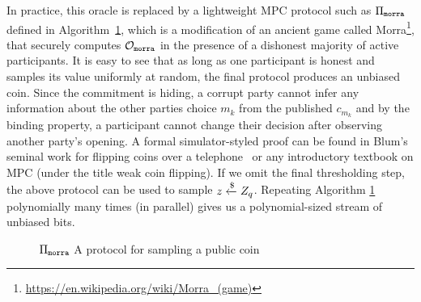 In practice, this oracle is replaced by a lightweight MPC protocol such as $\Pi_{\mathtt{morra}}$ defined in Algorithm~\ref{alg: morra}, which is a modification of an ancient game called Morra\footnote{\url{https://en.wikipedia.org/wiki/Morra_(game)}}, that securely computes $\mathcal{O}_{\mathtt{morra}}$ in the presence of a dishonest majority of active participants.
It is easy to see that as long as one participant is honest and samples its value uniformly at random, the final protocol produces an unbiased coin.  Since the commitment is hiding, a corrupt party cannot infer any information about the other parties choice $m_k$ from the published $c_{m_k}$ and by the binding property, a participant cannot change their decision after observing another party's opening. A formal simulator-styled proof can be found in Blum's seminal work for flipping coins over a telephone~\cite{blum1983coin} or any introductory textbook on MPC (under the title weak coin flipping).  If we omit the final thresholding step, the above protocol can be used to sample $z \xleftarrow{\$} Z_q$. Repeating Algorithm \ref{alg: morra} polynomially many times (in parallel) gives us a polynomial-sized stream of unbiased bits.



\begin{figure}
\caption{$\Pi_{\mathtt{morra}}$ A protocol for sampling a public coin}
\label{alg: morra}
\end{figure}


